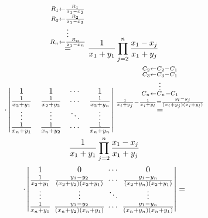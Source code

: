 \documentclass{article}
\begin{document}
\begin{multline*}
\overset{\substack{R_{1} \leftarrow \frac{R_{1}}{x_{1}-x_{2}} \\ R_{2} \leftarrow \frac{R_{2}}{x_{1}-x_{3}} \\ \vdots \\ R_{n} \leftarrow \frac{R_{n}}{x_{1}-x_{n}} }}{=} \frac{1}{x_{1}+y_{1}}\prod_{j=2}^{n}\frac{x_{1} - x_{j}}{x_{1}+y_{j}} \\
\cdot \left|\begin{matrix} 1 & 1 & \cdots & 1 \\ \frac{1}{x_{2}+y_{1}} & \frac{1}{x_{2}+y_{2}} & \cdots & \frac{1}{x_{2}+y_{n}} \\ \vdots & \vdots & \ddots & \vdots \\ \frac{1}{x_{n}+y_{1}} & \frac{1}{x_{n}+y_{2}} & \cdots & \frac{1}{x_{n}+y_{n}} \end{matrix}\right| \overset{\substack{C_{2} \leftarrow C_{2} - C_{1} \\ C_{3} \leftarrow C_{3} - C_{1} \\ \vdots \\ C_{n} \leftarrow C_{n} - C_{1} \\ \frac{1}{x_{i} + y_{j}} - \frac{1}{x_{i} + y_{l}} = \frac{y_{l}-y_{j}}{(x_{i} + y_{j})(x_{i} + y_{l})}}}{=} \\
\frac{1}{x_{1}+y_{1}}\prod_{j=2}^{n}\frac{x_{1}-x_{j}}{x_{1}+y_{j}} \\
\cdot \left|\setlength{\arraycolsep}{2pt}\begin{matrix} 1 & 0 & \cdots & 0 \\ \frac{1}{x_{2}+y_{1}} & \frac{y_{1}-y_{2}}{(x_{2}+y_{2})(x_{2}+y_{1})} & \cdots & \frac{y_{1}-y_{n}}{(x_{2}+y_{n})(x_{2}+y_{1})} \\ \vdots & \vdots & \ddots & \vdots \\ \frac{1}{x_{n}+y_{1}} & \frac{y_{1}-y_{2}}{(x_{n}+y_{2})(x_{n}+y_{1})} & \cdots & \frac{y_{1}-y_{n}}{(x_{n}+y_{n})(x_{n}+y_{1})} \end{matrix}\right| =
\end{multline*}
\end{document}
